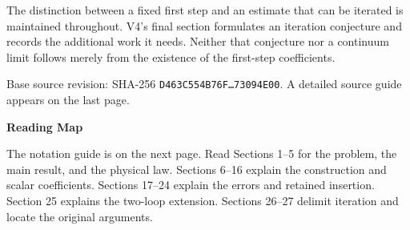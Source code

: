 \documentclass[11pt,a4paper]{article}
\begin{document}
The distinction between a fixed first step and an estimate that can be iterated is maintained throughout. V4's final section formulates an iteration conjecture and records the additional work it needs. Neither that conjecture nor a continuum limit follows merely from the existence of the first-step coefficients.

\vfill
{\small\color{muted}Base source revision: SHA-256 \texttt{D463C554B76F\ldots 73094E00}.\quad
    A detailed source guide appears on the last page.\par}

\clearpage
\thispagestyle{fancy}
{\LARGE\bfseries\color{ink}Reading Map\par}
\vspace{9pt}
The notation guide is on the next page. Read Sections 1--5 for the problem, the main result, and the physical law. Sections 6--16 explain the construction and scalar coefficients. Sections 17--24 explain the errors and retained insertion. Section 25 explains the two-loop extension. Sections 26--27 delimit iteration and locate the original arguments.
\end{document}
